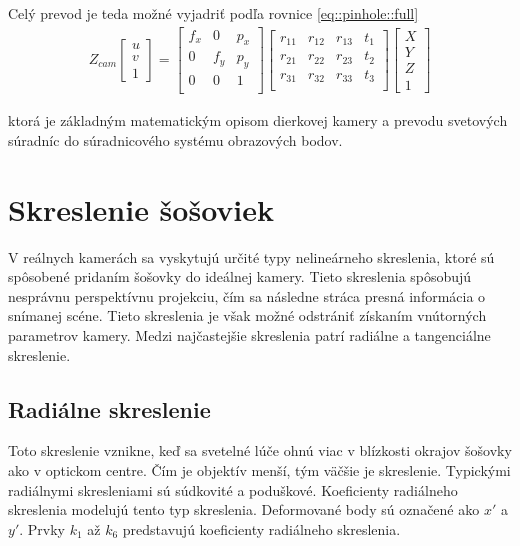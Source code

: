Celý prevod je teda možné vyjadriť podľa rovnice \ref{eq::pinhole::full} 
\begin{equation}
\label{eq::pinhole::full}
\begin{aligned}
Z_{cam}
\begin{bmatrix}
u \\ v \\ 1
\end{bmatrix}
=
\begin{bmatrix}
f_x & 0 & p_x \\
0 & f_y & p_y \\
0 & 0 & 1 \\
\end{bmatrix}
\begin{bmatrix}
r_{11} & r_{12} & r_{13} & t_{1} \\
r_{21} & r_{22} & r_{23} & t_{2} \\
r_{31} & r_{32} & r_{33} & t_{3} \\
\end{bmatrix}
\begin{bmatrix}
X \\ Y \\ Z \\ 1
\end{bmatrix}
\end{aligned}
\end{equation}

ktorá je základným matematickým opisom dierkovej kamery a prevodu svetových súradníc do súradnicového systému obrazových bodov. 

\section{Skreslenie šošoviek}

V reálnych kamerách sa vyskytujú určité typy nelineárneho skreslenia, ktoré sú spôsobené pridaním šošovky do ideálnej kamery. Tieto skreslenia spôsobujú nesprávnu perspektívnu projekciu, čím sa následne stráca presná informácia o snímanej scéne. Tieto skreslenia je však možné odstrániť získaním vnútorných parametrov kamery. Medzi najčastejšie skreslenia patrí radiálne a tangenciálne skreslenie. 

\subsection{Radiálne skreslenie}
Toto skreslenie vznikne, keď sa svetelné lúče ohnú viac v blízkosti okrajov šošovky ako v optickom centre. Čím je objektív menší, tým väčšie je skreslenie. Typickými radiálnymi skresleniami sú súdkovité a poduškové. Koeficienty radiálneho skreslenia modelujú tento typ skreslenia. Deformované body sú označené ako $x'$ a $y'$. Prvky $k_1$ až $k_6$ predstavujú koeficienty radiálneho skreslenia. 

